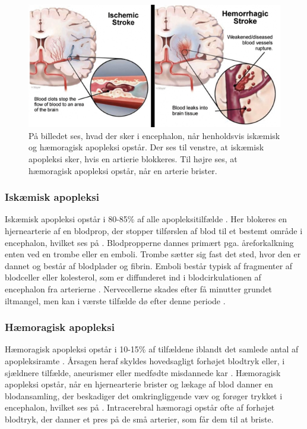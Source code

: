 \begin{figure}[H]
	\centering
	\includegraphics[scale=0.8]{figures/bProblemanalyse/haemoragisk_og_iskaemisk.png}
	\caption{På billedet ses, hvad der sker i encephalon, når henholdsvis iskæmisk og hæmoragisk apopleksi opstår. Der ses til venstre, at iskæmisk apopleksi sker, hvis en artierie blokkeres. Til højre ses, at hæmoragisk apopleksi opstår, når en arterie brister. \cite{Ritter2015}}
	\label{haem-isk}
\end{figure}

\subsubsection{Iskæmisk apopleksi}\label{IskaemiskApp}
Iskæmisk apopleksi opstår i 80-85\% af alle apopleksitilfælde \cite{Sundhed.dk2014}. Her blokeres en hjernearterie af en blodprop, der stopper tilførslen af blod til et bestemt område i encephalon, hvilket ses på . Blodpropperne dannes primært pga. åreforkalkning enten ved en trombe eller en emboli. Trombe sætter sig fast det sted, hvor den er dannet og består af blodplader og fibrin. \cite{Schulze2011} Emboli består typisk af fragmenter af blodceller eller kolesterol, som er diffunderet ind i blodcirkulationen af encephalon fra arterierne \cite{Academic2015a}. Nervecellerne skades efter få minutter grundet iltmangel, men kan i værste tilfælde dø efter denne periode \cite{Schulze2011,Giraldo2015}.%

\subsubsection{Hæmoragisk apopleksi}
Hæmoragisk apopleksi opstår i 10-15\% af tilfældene iblandt det samlede antal af apopleksiramte \cite{Sundhed.dk2014}. Årsagen heraf skyldes hovedsagligt forhøjet blodtryk eller, i sjældnere tilfælde, aneurismer eller medfødte misdannede kar \cite{Schulze2011}. Hæmoragisk apopleksi opstår, når en hjernearterie brister og lækage af blod danner en blodansamling, der beskadiger det omkringliggende væv og forøger trykket i encephalon, hvilket ses på . Intracerebral hæmoragi opstår ofte af forhøjet blodtryk, der danner et pres på de små arterier, som får dem til at briste. \cite{Caplan2006}

